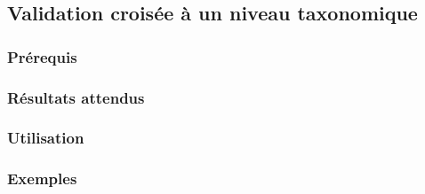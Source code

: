 \subsection{Validation croisée à un niveau taxonomique}
\label{graph}
\subsubsection{Prérequis}

\subsubsection{Résultats attendus}

\subsubsection{Utilisation}

\subsubsection{Exemples}
